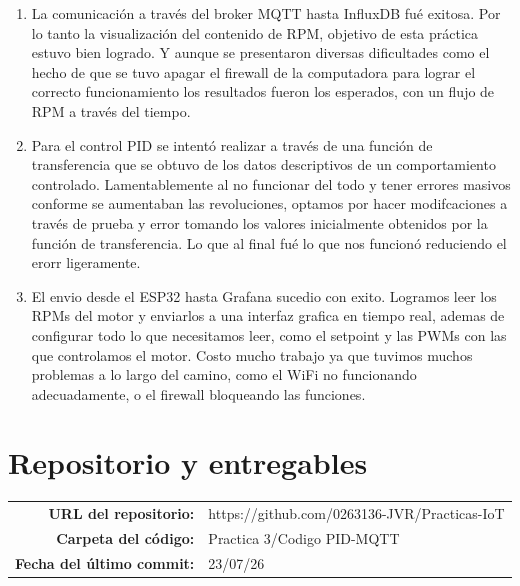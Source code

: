 \documentclass[11pt, letterpaper]{article}
\begin{document}
\begin{enumerate}[leftmargin=1.5cm, itemsep=0.5cm]
  \item La comunicaci\'on a trav\'es del broker MQTT hasta InfluxDB fu\'e exitosa.  Por lo tanto la visualizaci\'on del contenido de RPM, objetivo de esta pr\'actica estuvo bien logrado. Y aunque se presentaron diversas dificultades como el hecho de que se tuvo apagar el firewall de la computadora para lograr el correcto funcionamiento los resultados fueron los esperados, con un flujo de RPM a trav\'es del tiempo.
  \item Para el control PID se intent\'o realizar a trav\'es de una funci\'on de transferencia que se obtuvo de los datos descriptivos de un comportamiento controlado. Lamentablemente al no funcionar del todo y tener errores masivos conforme se aumentaban las revoluciones, optamos por hacer modifcaciones a trav\'es de prueba y error tomando los valores inicialmente obtenidos por la funci\'on de transferencia. Lo que al final fué lo que nos funcionó reduciendo el erorr ligeramente.
  \item El envio desde el ESP32 hasta Grafana sucedio con exito. Logramos leer los RPMs del motor y enviarlos a una interfaz grafica en tiempo real, ademas de configurar todo lo que necesitamos leer, como el setpoint y las PWMs con las que controlamos el motor. Costo mucho trabajo ya que tuvimos muchos problemas a lo largo del camino, como el WiFi no funcionando adecuadamente, o el firewall bloqueando las funciones.
\end{enumerate}

\section{Repositorio y entregables}

\begin{tabular}{rl}
  \textbf{URL del repositorio:} & https://github.com/0263136-JVR/Practicas-IoT\\[0.6em]
  \textbf{Carpeta del c\'odigo:} & Practica 3/Codigo PID-MQTT\\[0.6em]
  \textbf{Fecha del \'ultimo commit:} & 23/07/26\\
\end{tabular}

\vspace{0.5cm}
\end{document}
